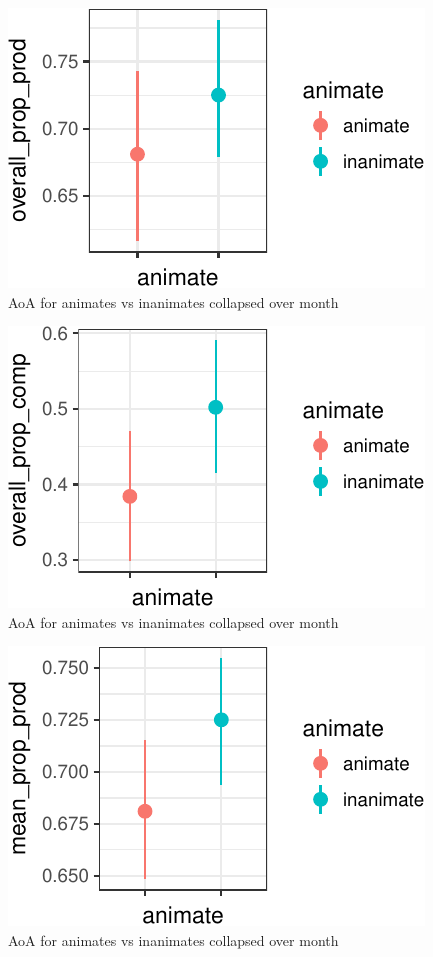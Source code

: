 \documentclass[10pt, letterpaper]{article}
\newenvironment{CodeChunk}{}{}
\begin{document}
\begin{CodeChunk}
\begin{figure}[tb]
\includegraphics{figs/animacy_aoa_overall-1} \caption[AoA for animates vs inanimates collapsed over month]{AoA for animates vs inanimates collapsed over month}\label{fig:animacy_aoa_overall1}
\end{figure}
\begin{figure}[tb]
\includegraphics{figs/animacy_aoa_overall-2} \caption[AoA for animates vs inanimates collapsed over month]{AoA for animates vs inanimates collapsed over month}\label{fig:animacy_aoa_overall2}
\end{figure}
\begin{figure}[tb]
\includegraphics{figs/animacy_aoa_overall-3} \caption[AoA for animates vs inanimates collapsed over month]{AoA for animates vs inanimates collapsed over month}\label{fig:animacy_aoa_overall3}

\end{figure}
\end{CodeChunk}
\end{document}
